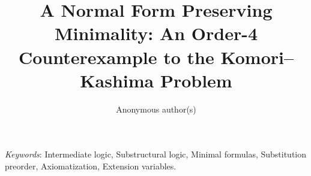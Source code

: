 \documentclass[11pt,dvipdfmx]{article}
\title{A Normal Form Preserving Minimality: An Order-4
  Counterexample to the Komori--Kashima Problem}
\author{Anonymous author(s)}
\date{}
\begin{document}
\maketitle



\noindent\textit{Keywords}: Intermediate logic, Substructural logic, Minimal
formulas, Substitution preorder, Axiomatization, Extension variables.














\appendix



\end{document}
